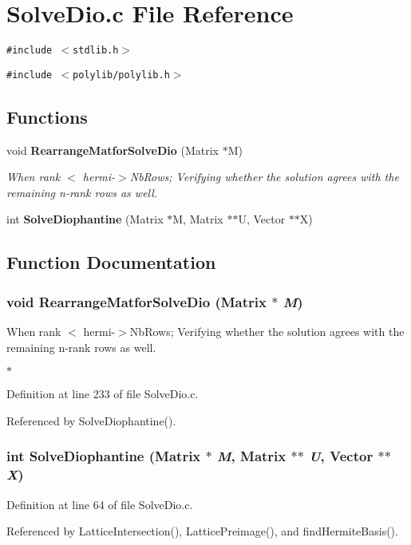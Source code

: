 \section{Solve\-Dio.c File Reference}
\label{SolveDio_8c}
{\tt \#include $<$stdlib.h$>$}\par
{\tt \#include $<$polylib/polylib.h$>$}\par
\subsection*{Functions}
\begin{CompactItemize}
\item 
void {\bf Rearrange\-Matfor\-Solve\-Dio} (Matrix $\ast$M)
\begin{CompactList}\small\item\em When rank $<$ hermi-$>$Nb\-Rows; Verifying whether the solution agrees with the remaining n-rank rows as well.\item\end{CompactList}\item 
int {\bf Solve\-Diophantine} (Matrix $\ast$M, Matrix $\ast$$\ast$U, Vector $\ast$$\ast$X)
\end{CompactItemize}


\subsection{Function Documentation}
\subsubsection{\setlength{\rightskip}{0pt plus 5cm}void Rearrange\-Matfor\-Solve\-Dio (Matrix $\ast$ {\em M})\hspace{0.3cm}{\tt  [static]}}\label{SolveDio_8c_a0}


When rank $<$ hermi-$>$Nb\-Rows; Verifying whether the solution agrees with the remaining n-rank rows as well.

$\ast$ 

Definition at line 233 of file Solve\-Dio.c.

Referenced by Solve\-Diophantine().

\subsubsection{\setlength{\rightskip}{0pt plus 5cm}int Solve\-Diophantine (Matrix $\ast$ {\em M}, Matrix $\ast$$\ast$ {\em U}, Vector $\ast$$\ast$ {\em X})}\label{SolveDio_8c_a1}




Definition at line 64 of file Solve\-Dio.c.

Referenced by Lattice\-Intersection(), Lattice\-Preimage(), and find\-Hermite\-Basis().

